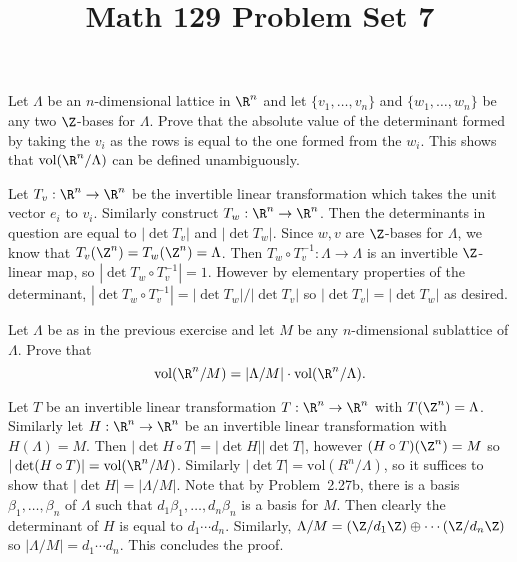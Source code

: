 \documentclass[11pt,letterpaper]{article}
\title{\textbf{Math 129 Problem Set 7}}
\begin{document}
\maketitle

\begin{cproblem}{5.2}
    Let $\Lambda$ be an $n$-dimensional lattice in $\R^n$ and let $\{v_1,\ldots,v_n\}$ and $\{w_1,\ldots,w_n\}$ be any two $\Z$-bases for $\Lambda$. Prove that the absolute value of the determinant formed by taking the $v_i$ as the rows is equal to the one formed from the $w_i$. This shows that $\textrm{vol}(\R^n /\Lambda)$ can be defined unambiguously.  
\end{cproblem}

\begin{solution}
    Let $T_v : \R^n \to \R^n$ be the invertible linear transformation which takes the unit vector $e_i$ to $v_i$. Similarly construct $T_w : \R^n \to \R^n$. Then the determinants in question are equal to $|\det T_v|$ and $|\det T_w|$. Since $w,v$ are $\Z$-bases for $\Lambda$, we know that $T_v(\Z^n)=T_w(\Z^n)=\Lambda$. Then $T_w\circ T_v^{-1} : \Lambda \to \Lambda$ is an invertible $\Z$-linear map, so $|\det T_w\circ T_v^{-1}| = 1$. However by elementary properties of the determinant, $|\det T_w\circ T_v^{-1}| = |\det T_w|/ |\det T_v|$ so $|\det T_v|=|\det T_w|$ as desired. 
\end{solution}

\begin{cproblem}{5.3}
    Let $\Lambda$ be as in the previous exercise and let $M$ be any $n$-dimensional sublattice of $\Lambda$. Prove that
    \[
        \textrm{vol}(\R^n / M) = |\Lambda / M|\cdot \textrm{vol}(\R^n/\Lambda)
    .\] 
\end{cproblem}
\begin{solution}
    Let $T$ be an invertible linear transformation $T : \R^n \to \R^n$ with $T(\Z^n) = \Lambda$. Similarly let $H : \R^n \to \R^n$ be an invertible linear transformation with $H(\Lambda) = M$. Then $|\det H\circ T| =|\det H||\det T|$, however $(H\circ T)(\Z^n)=M$ so $|\det(H\circ T)| =\textrm{vol}(\R^n /M)$. Similarly $|\det T| = \textrm{vol}(R^n /\Lambda)$, so it suffices to show that $|\det H| = | \Lambda / M|$. Note that by Problem~2.27b, there is a basis $\beta_1,\ldots,\beta_n$ of $\Lambda$ such that $d_1\beta_1,\ldots,d_n\beta_n$ is a basis for $M$. Then clearly the determinant of $H$ is equal to $d_1\cdots d_n$. Similarly, $\Lambda / M = (\Z/d_1\Z)\oplus\cdots (\Z /d_n\Z)$ so $|\Lambda /M|=d_1\cdots d_n$. This concludes the proof. 
\end{solution}
\end{document}
